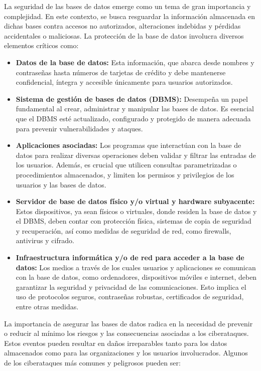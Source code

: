 \documentclass[11pt]{report}
\begin{document}
La seguridad de las bases de datos emerge como un tema de gran importancia y
complejidad. En este contexto, se busca resguardar la información almacenada en dichas
bases contra accesos no autorizados, alteraciones indebidas y pérdidas accidentales o
maliciosas. La protección de la base de datos involucra diversos elementos críticos como:

\begin{itemize}
\item \textbf{Datos de la base de datos:} Esta información, que abarca desde nombres y
contraseñas hasta números de tarjetas de crédito y debe mantenerse confidencial,
íntegra y accesible únicamente para usuarios autorizados.
\item \textbf{Sistema de gestión de bases de datos (DBMS):} Desempeña un papel fundamental
al crear, administrar y manipular las bases de datos. Es esencial que el DBMS esté
actualizado, configurado y protegido de manera adecuada para prevenir
vulnerabilidades y ataques.
\item \textbf{Aplicaciones asociadas:} Los programas que interactúan con la base de datos para
realizar diversas operaciones deben validar y filtrar las entradas de los usuarios.
Además, es crucial que utilicen consultas parametrizadas o procedimientos
almacenados, y limiten los permisos y privilegios de los usuarios y las bases de
datos.
\item \textbf{Servidor de base de datos físico y/o virtual y hardware subyacente:} Estos
dispositivos, ya sean físicos o virtuales, donde residen la base de datos y el DBMS,
deben contar con protección física, sistemas de copia de seguridad y recuperación,
así como medidas de seguridad de red, como firewalls, antivirus y cifrado.
\item \textbf{Infraestructura informática y/o de red para acceder a la base de datos:} Los medios a
través de los cuales usuarios y aplicaciones se comunican con la base de datos,
como ordenadores, dispositivos móviles e internet, deben garantizar la seguridad y
privacidad de las comunicaciones. Esto implica el uso de protocolos seguros,
contraseñas robustas, certificados de seguridad, entre otras medidas.
\end{itemize}

La importancia de asegurar las bases de datos radica en la necesidad de prevenir o reducir
al mínimo los riesgos y las consecuencias asociadas a los ciberataques. Estos eventos
pueden resultar en daños irreparables tanto para los datos almacenados como para las
organizaciones y los usuarios involucrados. Algunos de los ciberataques más comunes y
peligrosos pueden ser:
\end{document}
